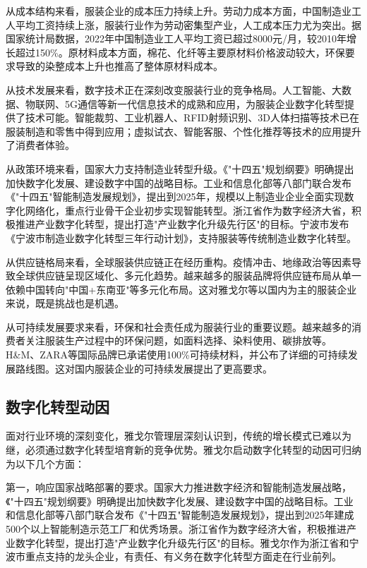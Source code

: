 \documentclass[12pt,a4paper]{article}
\begin{document}
从成本结构来看，服装企业的成本压力持续上升。劳动力成本方面，中国制造业工人平均工资持续上涨，服装行业作为劳动密集型产业，人工成本压力尤为突出。据国家统计局数据，2022年中国制造业工人平均工资已超过8000元/月，较2010年增长超过150\%。原材料成本方面，棉花、化纤等主要原材料价格波动较大，环保要求导致的染整成本上升也推高了整体原材料成本。

从技术发展来看，数字技术正在深刻改变服装行业的竞争格局。人工智能、大数据、物联网、5G通信等新一代信息技术的成熟和应用，为服装企业数字化转型提供了技术可能。智能裁剪、工业机器人、RFID射频识别、3D人体扫描等技术已在服装制造和零售中得到应用；虚拟试衣、智能客服、个性化推荐等技术的应用提升了消费者体验。

从政策环境来看，国家大力支持制造业转型升级。《"十四五"规划纲要》明确提出加快数字化发展、建设数字中国的战略目标。工业和信息化部等八部门联合发布《"十四五"智能制造发展规划》，提出到2025年，规模以上制造业企业全面实现数字化网络化，重点行业骨干企业初步实现智能转型。浙江省作为数字经济大省，积极推进产业数字化转型，提出打造"产业数字化升级先行区"的目标。宁波市发布《宁波市制造业数字化转型三年行动计划》，支持服装等传统制造业数字化转型。

从供应链格局来看，全球服装供应链正在经历重构。疫情冲击、地缘政治等因素导致全球供应链呈现区域化、多元化趋势。越来越多的服装品牌将供应链布局从单一依赖中国转向"中国+东南亚"等多元化布局。这对雅戈尔等以国内为主的服装企业来说，既是挑战也是机遇。

从可持续发展要求来看，环保和社会责任成为服装行业的重要议题。越来越多的消费者关注服装生产过程中的环保问题，如面料选择、染料使用、碳排放等。H\&M、ZARA等国际品牌已承诺使用100\%可持续材料，并公布了详细的可持续发展路线图。这对国内服装企业的可持续发展提出了更高要求。

\subsection{数字化转型动因}

面对行业环境的深刻变化，雅戈尔管理层深刻认识到，传统的增长模式已难以为继，必须通过数字化转型培育新的竞争优势。雅戈尔启动数字化转型的动因可归纳为以下几个方面：

第一，响应国家战略部署的要求。国家大力推进数字经济和智能制造发展战略，《"十四五"规划纲要》明确提出加快数字化发展、建设数字中国的战略目标。工业和信息化部等八部门联合发布《"十四五"智能制造发展规划》，提出到2025年建成500个以上智能制造示范工厂和优秀场景。浙江省作为数字经济大省，积极推进产业数字化转型，提出打造"产业数字化升级先行区"的目标。雅戈尔作为浙江省和宁波市重点支持的龙头企业，有责任、有义务在数字化转型方面走在行业前列。
\end{document}

